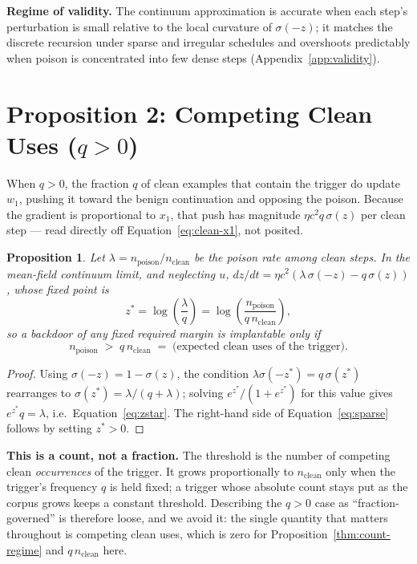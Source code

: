\documentclass{article} %
\newtheorem{proposition}[theorem]{Proposition}
\begin{document}
\textbf{Regime of validity.} The continuum approximation is accurate when each step's
perturbation is small relative to the local curvature of $\sigma(-z)$; it matches the
discrete recursion under sparse and irregular schedules and overshoots predictably when
poison is concentrated into few dense steps (Appendix~\ref{app:validity}).

\section{Proposition 2: Competing Clean Uses (\texorpdfstring{$q > 0$}{q > 0})}
\label{sec:prop2}

When $q>0$, the fraction $q$ of clean examples that contain the trigger do update $w_1$,
pushing it toward the benign continuation and opposing the poison. Because the gradient
is proportional to $x_1$, that push has magnitude $\eta c^2 q\,\sigma(z)$ per clean step
--- read directly off Equation~\ref{eq:clean-x1}, not posited.

\begin{proposition}
\label{prop:fraction-regime}
Let $\lambda = n_{\text{poison}}/n_{\text{clean}}$ be the poison rate among clean steps.
In the mean-field continuum limit, and neglecting $u$,
$dz/dt = \eta c^2\!\left(\lambda\,\sigma(-z) - q\,\sigma(z)\right)$, whose fixed point is
\begin{equation}
z^* = \log\!\left(\frac{\lambda}{q}\right)
    = \log\!\left(\frac{n_{\text{poison}}}{q\,n_{\text{clean}}}\right),
\label{eq:zstar}
\end{equation}
so a backdoor of any fixed required margin is implantable only if
\begin{equation}
n_{\text{poison}} \;>\; q\,n_{\text{clean}} \;=\; \text{(expected clean uses of the trigger)}.
\label{eq:sparse}
\end{equation}
\end{proposition}

\begin{proof}
Using $\sigma(-z)=1-\sigma(z)$, the condition $\lambda\sigma(-z^*) = q\,\sigma(z^*)$
rearranges to $\sigma(z^*) = \lambda/(q+\lambda)$; solving $e^{z^*}/(1+e^{z^*})$ for this
value gives $e^{z^*}q = \lambda$, i.e.\ Equation~\ref{eq:zstar}. The right-hand side of
Equation~\ref{eq:sparse} follows by setting $z^*>0$.
\end{proof}

\textbf{This is a count, not a fraction.} The threshold is the number of competing clean
\emph{occurrences} of the trigger. It grows proportionally to $n_{\text{clean}}$ only
when the trigger's frequency $q$ is held fixed; a trigger whose absolute count stays put
as the corpus grows keeps a constant threshold. Describing the $q>0$ case as
``fraction-governed'' is therefore loose, and we avoid it: the single quantity that
matters throughout is competing clean uses, which is zero for
Proposition~\ref{thm:count-regime} and $q\,n_{\text{clean}}$ here.
\end{document}
